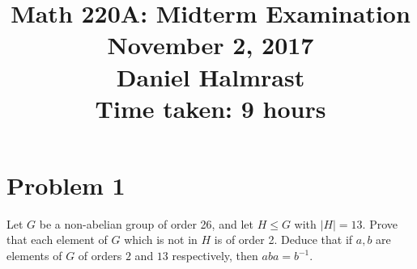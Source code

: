 \documentclass[12pt,reqno]{amsart}
\newcommand{\inv}{^{-1}}
\begin{document}
\title[]{Math 220A: Midterm Examination\\
        November 2, 2017\\
        Daniel Halmrast\\
        Time taken: 9 hours}
\maketitle
\large
\section*{Problem 1}
Let $G$ be a non-abelian group of order 26, and let $H\leq G$ with $|H|=13$.
Prove that each element of $G$ which is not in $H$ is of order 2. Deduce that
if $a, b$ are elements of $G$ of orders $2$ and $13$ respectively, then
$aba=b\inv$.
\\
\end{document}
